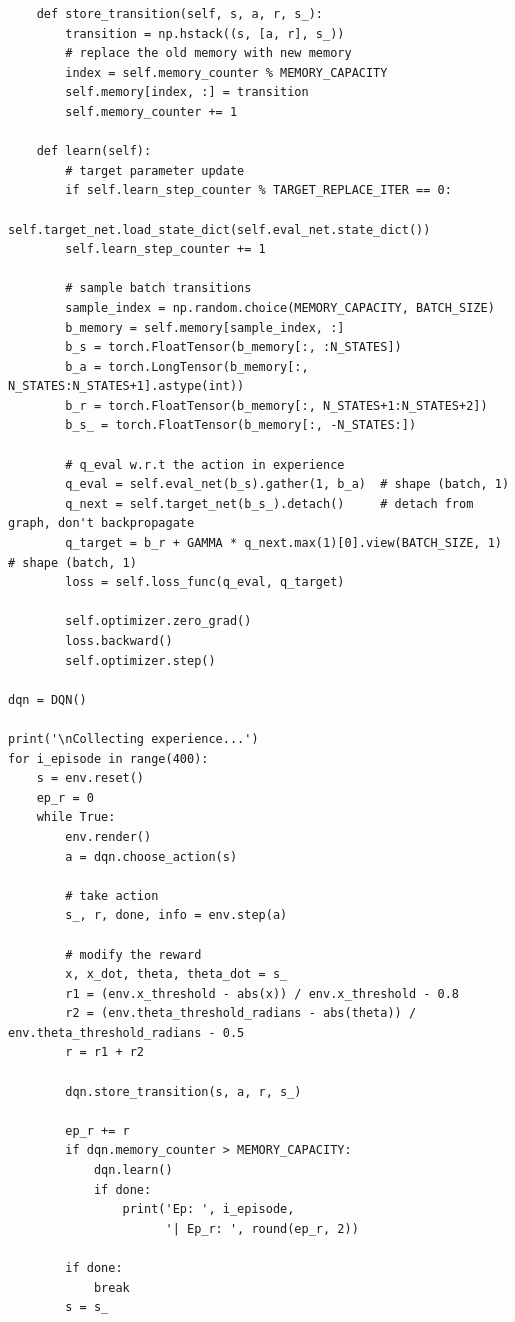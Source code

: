 \documentclass{book}
\begin{document}
\begin{lstlisting}
    def store_transition(self, s, a, r, s_):
        transition = np.hstack((s, [a, r], s_))
        # replace the old memory with new memory
        index = self.memory_counter % MEMORY_CAPACITY
        self.memory[index, :] = transition
        self.memory_counter += 1

    def learn(self):
        # target parameter update
        if self.learn_step_counter % TARGET_REPLACE_ITER == 0:
            self.target_net.load_state_dict(self.eval_net.state_dict())
        self.learn_step_counter += 1

        # sample batch transitions
        sample_index = np.random.choice(MEMORY_CAPACITY, BATCH_SIZE)
        b_memory = self.memory[sample_index, :]
        b_s = torch.FloatTensor(b_memory[:, :N_STATES])
        b_a = torch.LongTensor(b_memory[:, N_STATES:N_STATES+1].astype(int))
        b_r = torch.FloatTensor(b_memory[:, N_STATES+1:N_STATES+2])
        b_s_ = torch.FloatTensor(b_memory[:, -N_STATES:])

        # q_eval w.r.t the action in experience
        q_eval = self.eval_net(b_s).gather(1, b_a)  # shape (batch, 1)
        q_next = self.target_net(b_s_).detach()     # detach from graph, don't backpropagate
        q_target = b_r + GAMMA * q_next.max(1)[0].view(BATCH_SIZE, 1)   # shape (batch, 1)
        loss = self.loss_func(q_eval, q_target)

        self.optimizer.zero_grad()
        loss.backward()
        self.optimizer.step()

dqn = DQN()

print('\nCollecting experience...')
for i_episode in range(400):
    s = env.reset()
    ep_r = 0
    while True:
        env.render()
        a = dqn.choose_action(s)

        # take action
        s_, r, done, info = env.step(a)

        # modify the reward
        x, x_dot, theta, theta_dot = s_
        r1 = (env.x_threshold - abs(x)) / env.x_threshold - 0.8
        r2 = (env.theta_threshold_radians - abs(theta)) / env.theta_threshold_radians - 0.5
        r = r1 + r2

        dqn.store_transition(s, a, r, s_)

        ep_r += r
        if dqn.memory_counter > MEMORY_CAPACITY:
            dqn.learn()
            if done:
                print('Ep: ', i_episode,
                      '| Ep_r: ', round(ep_r, 2))

        if done:
            break
        s = s_
\end{lstlisting}
\end{document}
